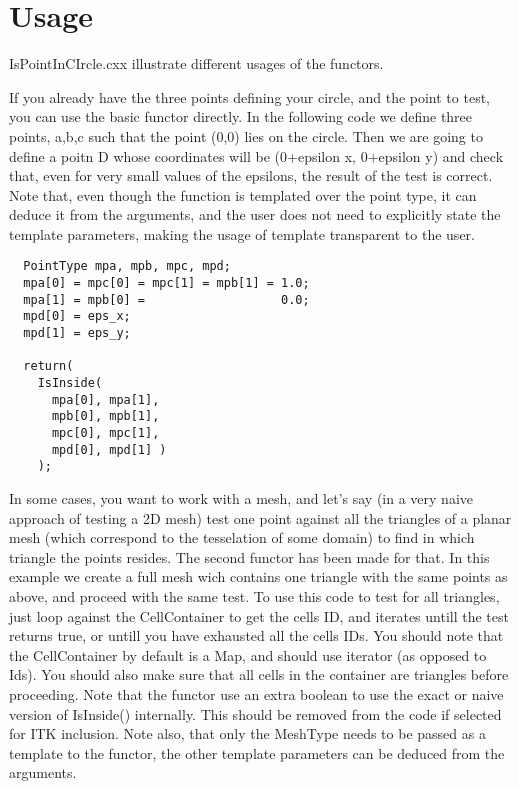 \documentclass{InsightArticle}
\begin{document}
\section{Usage}

IsPointInCIrcle.cxx illustrate different usages of the functors.

If you already have the three points defining your circle, and the point to test, you can use the basic functor directly. In the following code we define three points, a,b,c such that the point (0,0) lies on the circle. Then we are going to define a poitn D whose coordinates will be (0+epsilon x, 0+epsilon y) and check that, even for very small values of the epsilons, the result of the test is correct.
Note that, even though the function is templated over the point type, it can deduce it from the arguments, and the user does not need to explicitly state the template parameters, making the usage of template transparent to the user.

\begin{verbatim}
  PointType mpa, mpb, mpc, mpd;
  mpa[0] = mpc[0] = mpc[1] = mpb[1] = 1.0;
  mpa[1] = mpb[0] =                   0.0;
  mpd[0] = eps_x;
  mpd[1] = eps_y;

  return(
    IsInside(
      mpa[0], mpa[1],
      mpb[0], mpb[1],
      mpc[0], mpc[1],
      mpd[0], mpd[1] )
    );
\end{verbatim}

In some cases, you want to work with a mesh, and let's say (in a very naive approach of testing a 2D mesh)
test one point against all the triangles of a planar mesh (which correspond to the tesselation of some domain)
to find in which triangle the points resides. The second functor has been made for that.
In this example we create a full mesh wich contains one triangle with the same points as above,
and proceed with the same test. To use this code to test for all triangles,
just loop against the CellContainer to get the cells ID, and iterates untill the test returns true,
or untill you have exhausted all the cells IDs. You should note that the CellContainer by default is a Map,
and should use iterator (as opposed to Ids). You should also make sure that all cells in the container are triangles
before proceeding. Note that the functor use an extra boolean to use the exact or naive version of IsInside() internally. This should be removed from the code if selected for ITK inclusion. Note also, that only the MeshType needs to be passed as a template to the functor, the other template parameters can be deduced from the arguments.
 
\end{document}
